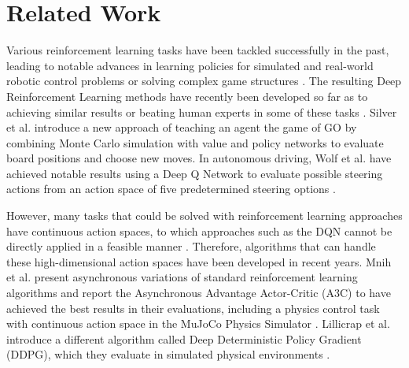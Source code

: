 \documentclass[letterpaper, 10 pt, conference]{ieeeconf}  %
\begin{document}

\section{Related Work}

Various reinforcement learning tasks have been tackled successfully in the past, 
leading to notable advances in learning policies for simulated and real-world 
robotic control problems \cite{Levine:2013:GPS:3042817.3042937}\cite{Bruin2015TheIO} 
or solving complex game structures \cite{Schaul2015PrioritizedER}. The resulting Deep Reinforcement Learning
 methods have recently been developed so far as to achieving similar results or beating human 
 experts in some of these tasks \cite{44806}\cite{mnih2015humanlevel}. 
Silver et al. introduce a new approach of teaching an 
 agent the game of GO by combining Monte Carlo simulation with value 
 and policy networks to evaluate board positions and choose new moves. In autonomous driving, 
 Wolf et al. have achieved notable results using a Deep Q Network to evaluate possible steering 
 actions from an action space of five predetermined steering options \cite{7995727}. 

However, many tasks that could be solved with reinforcement learning approaches have 
continuous action spaces, to which approaches such as the DQN cannot be directly applied 
in a feasible manner \cite{lillicrapContinuousControlDeep2015}. Therefore, algorithms that 
can handle these high-dimensional action spaces have been developed in recent years. Mnih et al. 
present asynchronous variations of standard reinforcement learning algorithms and report the 
Asynchronous Advantage Actor-Critic (A3C) to have achieved the best results in their evaluations, 
including a physics control task with continuous action space in the MuJoCo Physics Simulator \cite{mnihAsynchronousMethodsDeep2016}. 
Lillicrap et al. introduce a different algorithm called Deep Deterministic Policy Gradient (DDPG), 
which they evaluate in simulated physical environments \cite{mnih2013playing}.
\end{document}
